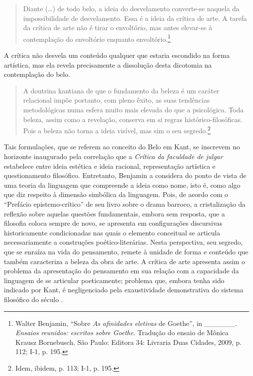 \begin{quote}
Diante (\ldots{}) de todo belo, a ideia do desvelamento converte-se naquela
da impossibilidade de desvelamento. Essa é a ideia da crítica de arte. A
tarefa da crítica de arte não é tirar o envoltório, mas antes elevar-se
à contemplação do envoltório enquanto envoltório.\footnote{Walter
  Benjamin, ``Sobre \emph{As afinidades eletivas} de Goethe'', in
  \_\_\_\_\_\_. \emph{Ensaios reunidos: escritos sobre Goethe}. Tradução
  do ensaio de Mônica Krausz Bornebusch. São Paulo: Editora 34: Livraria
  Duas Cidades, 2009, p. 112;  I-1, p. 195.}
\end{quote}

A crítica não desvela um conteúdo qualquer que estaria escondido na
forma artística, mas ela revela precisamente a dissolução desta
dicotomia na contemplação do belo.

\begin{quote}
A doutrina kantiana de que o fundamento da beleza é um caráter
relacional impõe portanto, com pleno êxito, as suas tendências
metodológicas numa esfera muito mais elevada do que a psicológica. Toda
beleza, assim como a revelação, conserva em si regras
histórico-filosóficas. Pois a beleza não torna a ideia visível, mas sim
o seu segredo.\footnote{Idem, ibidem, p. 113;  I-1, p. 195.}
\end{quote}

Tais formulações, que se referem ao conceito do Belo em Kant, se
inscrevem no horizonte inaugurado pela correlação que a \emph{Crítica da
faculdade de julgar} estabelece entre ideia estética e ideia racional,
representação artística e questionamento filosófico. Entretanto,
Benjamin a considera do ponto de vista de uma teoria da linguagem que
compreende a ideia como nome, isto é, como algo que diz respeito à
dimensão simbólica da linguagem. Pois, de acordo com o ``Prefácio
epistemo-crítico'' de seu livro sobre o drama barroco, a cristalização
da reflexão sobre aquelas questões fundamentais, embora sem resposta,
que a filosofia coloca sempre de novo, se apresenta em configurações
discursivas historicamente condicionadas nas quais o elemento conceitual
se articula necessariamente a construções poético-literárias. Nesta
perspectiva, seu segredo, que se enraíza na vida do pensamento, remete à
unidade de forma e conteúdo que também caracteriza a beleza da obra de
arte. A crítica de arte apresenta assim o problema da apresentação do
pensamento em sua relação com a capacidade da linguagem de se articular
poeticamente; problema que, embora tenha sido indicado por Kant, é
negligenciado pela exaustividade demonstrativa do sistema filosófico do
século .

